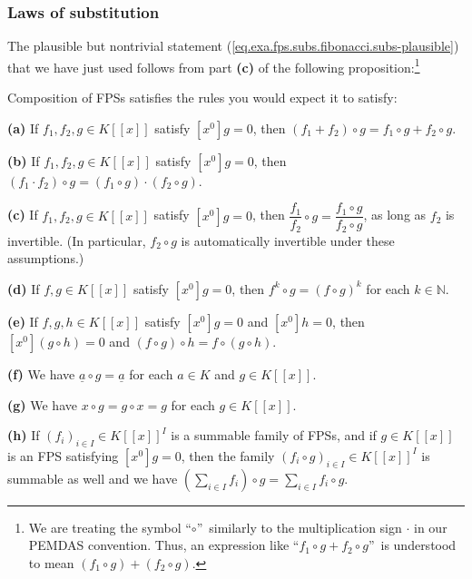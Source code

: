 \subsubsection{Laws of substitution}

The plausible but nontrivial statement
(\ref{eq.exa.fps.subs.fibonacci.subs-plausible}) that we have just used
follows from part \textbf{(c)} of the following proposition:\footnote{We are
treating the symbol \textquotedblleft$\circ$\textquotedblright\ similarly to
the multiplication sign $\cdot$ in our PEMDAS convention. Thus, an expression
like \textquotedblleft$f_{1}\circ g+f_{2}\circ g$\textquotedblright\ is
understood to mean $\left(  f_{1}\circ g\right)  +\left(  f_{2}\circ g\right)
$.}

\begin{proposition}
\label{prop.fps.subs.rules}Composition of FPSs satisfies the rules you would
expect it to satisfy: \medskip

\textbf{(a)} If $f_{1},f_{2},g\in K\left[  \left[  x\right]  \right]  $
satisfy $\left[  x^{0}\right]  g=0$, then $\left(  f_{1}+f_{2}\right)  \circ
g=f_{1}\circ g+f_{2}\circ g$. \medskip

\textbf{(b)} If $f_{1},f_{2},g\in K\left[  \left[  x\right]  \right]  $
satisfy $\left[  x^{0}\right]  g=0$, then $\left(  f_{1}\cdot f_{2}\right)
\circ g=\left(  f_{1}\circ g\right)  \cdot\left(  f_{2}\circ g\right)  $.
\medskip

\textbf{(c)} If $f_{1},f_{2},g\in K\left[  \left[  x\right]  \right]  $
satisfy $\left[  x^{0}\right]  g=0$, then $\dfrac{f_{1}}{f_{2}}\circ
g=\dfrac{f_{1}\circ g}{f_{2}\circ g}$, as long as $f_{2}$ is invertible. (In
particular, $f_{2}\circ g$ is automatically invertible under these
assumptions.) \medskip

\textbf{(d)} If $f,g\in K\left[  \left[  x\right]  \right]  $ satisfy $\left[
x^{0}\right]  g=0$, then $f^{k}\circ g=\left(  f\circ g\right)  ^{k}$ for each
$k\in\mathbb{N}$. \medskip

\textbf{(e)} If $f,g,h\in K\left[  \left[  x\right]  \right]  $ satisfy
$\left[  x^{0}\right]  g=0$ and $\left[  x^{0}\right]  h=0$, then $\left[
x^{0}\right]  \left(  g\circ h\right)  =0$ and $\left(  f\circ g\right)  \circ
h=f\circ\left(  g\circ h\right)  $. \medskip

\textbf{(f)} We have $\underline{a}\circ g=\underline{a}$ for each $a\in K$
and $g\in K\left[  \left[  x\right]  \right]  $. \medskip

\textbf{(g)} We have $x\circ g=g\circ x=g$ for each $g\in K\left[  \left[
x\right]  \right]  $. \medskip

\textbf{(h)} If $\left(  f_{i}\right)  _{i\in I}\in K\left[  \left[  x\right]
\right]  ^{I}$ is a summable family of FPSs, and if $g\in K\left[  \left[
x\right]  \right]  $ is an FPS satisfying $\left[  x^{0}\right]  g=0$, then
the family $\left(  f_{i}\circ g\right)  _{i\in I}\in K\left[  \left[
x\right]  \right]  ^{I}$ is summable as well and we have $\left(  \sum_{i\in
I}f_{i}\right)  \circ g=\sum_{i\in I}f_{i}\circ g$.
\end{proposition}

